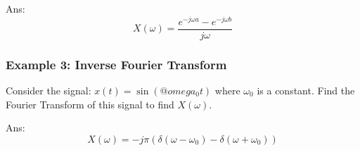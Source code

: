 Ans:
$$X(\omega)=\frac{e^{-j\omega a}-e^{-j\omega b}}{j\omega}$$
\subsubsection{Example 3: Inverse Fourier Transform}
Consider the signal: $x(t)=\sin(@omega_{0}t)$ where $\omega_{0}$ is a constant. Find the Fourier Transform of this signal to find $X(\omega)$.

Ans:
$$X(\omega)=-j\pi(\delta(\omega-\omega_0)-\delta(\omega+\omega_0))$$
